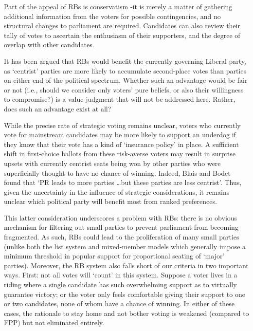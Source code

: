 Part of the appeal of RBs is conservatism \--it is merely a matter of gathering additional information from the voters for possible contingencies, and no structural changes to parliament are required. Candidates can also review their tally of votes to ascertain the enthusiasm of their supporters, and the degree of overlap with other candidates.

It has been argued\citep{Record} that RBs would benefit the currently governing Liberal party, as `centrist' parties are more likely to accumulate second-place votes than parties on either end of the political spectrum.
Whether such an advantage would be fair or not (i.e., should we consider only voters' pure beliefs, or also their willingness to compromise?) is a value judgment that will not be addressed here. Rather, does such an advantage exist at all?

While the precise rate of strategic voting remains unclear, voters who currently vote for mainstream candidates may be more likely to support an underdog if they know that their vote has a kind of `insurance policy' in place.
A sufficient shift in first-choice ballots from these risk-averse voters may result in surprise upsets with currently centrist seats being won by other parties who were superficially thought to have no chance of winning. Indeed, Blais and Bodet found that `PR  leads to more parties \ldots but these parties are less centrist'\citep{Blais_2006}.
Thus, given the uncertainty in the influence of strategic considerations, it remains  unclear which political party will benefit most from ranked preferences.

This latter consideration underscores a problem with RBs:  there is no obvious mechanism for filtering out small parties to prevent parliament from becoming fragmented. As such, RBs could lead to the proliferation of many small parties
(unlike both the list system and  mixed-member models which generally impose a minimum threshold in popular support for proportional seating of `major' parties).
Moreover, the RB system also falls short of our criteria in two important ways.
First: not all votes will `count' in this system.
Suppose a voter lives in a riding where a single candidate has such overwhelming support as to virtually guarantee victory; or the voter only feels comfortable giving their support to one or two candidates, none of whom have a chance of winning.
In either of these cases, the rationale to stay home and not bother voting is weakened (compared to FPP) but not eliminated entirely.

